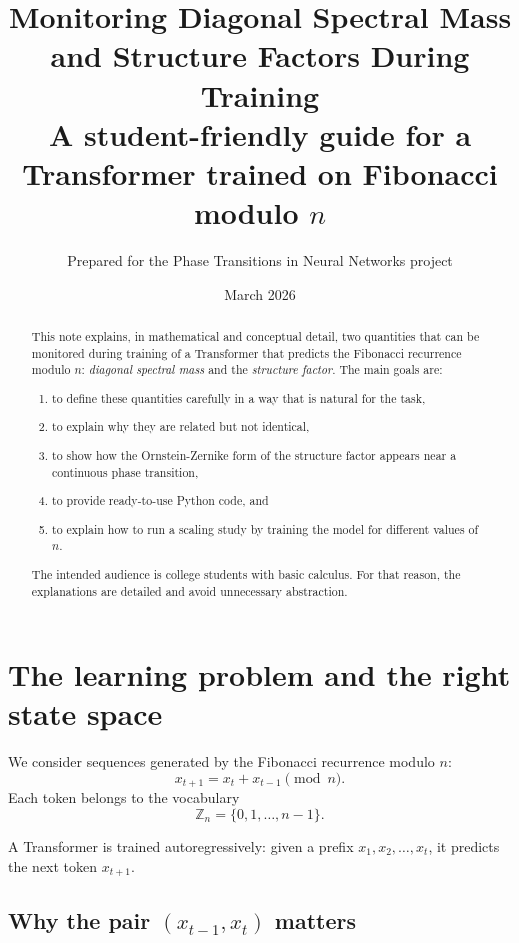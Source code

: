 \documentclass[11pt]{article}
\title{Monitoring Diagonal Spectral Mass and Structure Factors During Training\\[4pt]
\large A student-friendly guide for a Transformer trained on Fibonacci modulo $n$}
\author{Prepared for the Phase Transitions in Neural Networks project}
\date{March 2026}
\newcommand{\Zn}{\mathbb{Z}_n}
\begin{document}
\maketitle

\begin{abstract}
This note explains, in mathematical and conceptual detail, two quantities that can be monitored during training of a Transformer that predicts the Fibonacci recurrence modulo $n$:
\emph{diagonal spectral mass} and the \emph{structure factor}. The main goals are:
\begin{enumerate}[label=(\roman*)]
    \item to define these quantities carefully in a way that is natural for the task,
    \item to explain why they are related but not identical,
    \item to show how the Ornstein-Zernike form of the structure factor appears near a continuous phase transition,
    \item to provide ready-to-use Python code, and
    \item to explain how to run a scaling study by training the model for different values of $n$.
\end{enumerate}
The intended audience is college students with basic calculus. For that reason, the explanations are detailed and avoid unnecessary abstraction.
\end{abstract}

\tableofcontents
\newpage

\section{The learning problem and the right state space}

We consider sequences generated by the Fibonacci recurrence modulo $n$:
\begin{equation}
    x_{t+1} = x_t + x_{t-1} \pmod n.
\end{equation}
Each token belongs to the vocabulary
\begin{equation}
    \Zn = \{0,1,\dots,n-1\}.
\end{equation}

A Transformer is trained autoregressively: given a prefix $x_1,x_2,\dots,x_t$, it predicts the next token $x_{t+1}$.

\subsection{Why the pair $(x_{t-1},x_t)$ matters}
\end{document}

